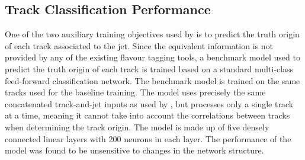


\subsection{Track Classification Performance}\label{sec:gnn_tc_perf}

One of the two auxiliary training objectives used by \GNN is to predict the truth origin of each track associated to the jet.
Since the equivalent information is not provided by any of the existing flavour tagging tools, a benchmark model used to predict the truth origin of each track is trained based on a standard multi-class feed-forward classification network.
The benchmark model is trained on the same tracks used for the baseline \GNN training.
The model uses precisely the same concatenated track-and-jet inputs as used by \GNN, but processes only a single track at a time, meaning it cannot take into account the correlations between tracks when determining the track origin.
The model is made up of five densely connected linear layers with 200 neurons in each layer.
The performance of the model was found to be unsensitive to changes in the network structure. 

